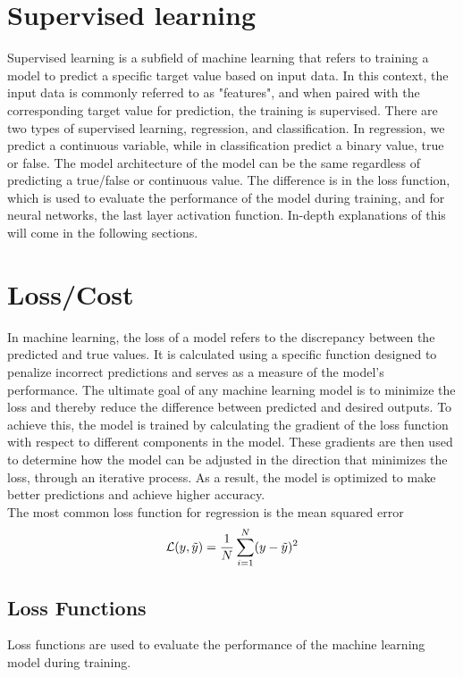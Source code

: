 \section{Supervised learning}
Supervised learning is a subfield of machine learning that refers to training a model to predict a specific target value based on input data.
In this context, the input data is commonly referred to as "features", and when paired with the corresponding target value for prediction, the training is supervised.
There are two types of supervised learning, regression, and classification. 
In regression, we predict a continuous variable, while in classification predict a binary value, true or false.
The model architecture of the model can be the same regardless of predicting a true/false or continuous value. 
The difference is in the loss function, which is used to evaluate the performance of the model during training, and for neural networks, the last layer activation function.
In-depth explanations of this will come in the following sections.

\section{Loss/Cost}
In machine learning, the loss of a model refers to the discrepancy between the predicted and true values.
It is calculated using a specific function designed to penalize incorrect predictions and serves as a measure of the model's performance.
The ultimate goal of any machine learning model is to minimize the loss and thereby reduce the difference between predicted and desired outputs.
To achieve this, the model is trained by calculating the gradient of the loss function with respect to different components in the model.
These gradients are then used to determine how the model can be adjusted in the direction that minimizes the loss, through an iterative process.
As a result, the model is optimized to make better predictions and achieve higher accuracy.\\

The most common loss function for regression is the mean squared error
\begin{equation} \label{eq:mse}
    \mathcal{L}(y, \Tilde{y}) = \frac{1}{N}\sum_{i=1}^N(y-\Tilde{y})^2
\end{equation}



\subsection{Loss Functions}
Loss functions are used to evaluate the performance of the machine learning model during training.


